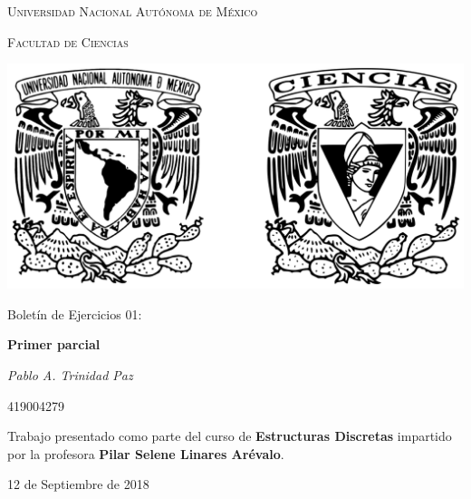 \documentclass[10pt,letterpaper]{article}
\begin{document}
\begin{titlepage}
    \centering

    {\scshape\LARGE Universidad Nacional Autónoma de México \par}

    \vspace{1cm}
    {\scshape\Large Facultad de Ciencias\par}
    \vspace{1.5cm}

    \begin{center}
        \includegraphics[scale=.1]{../../../assets/img/logo.png}
    \end{center}

    \vspace{.8 cm}

    {\LARGE Boletín de Ejercicios 01: \par}
    {\huge\bfseries Primer parcial \par}

    \vspace{0.5cm}
    {\large\itshape Pablo A. Trinidad Paz\par}
    419004279

    \vfill

    Trabajo presentado como parte del curso de \textbf{Estructuras Discretas}
    impartido por la profesora \textbf{Pilar Selene Linares Arévalo}. \par
    \vspace{0.1cm}
    {\large 12 de Septiembre de 2018\par}
\end{titlepage}
\end{document}
